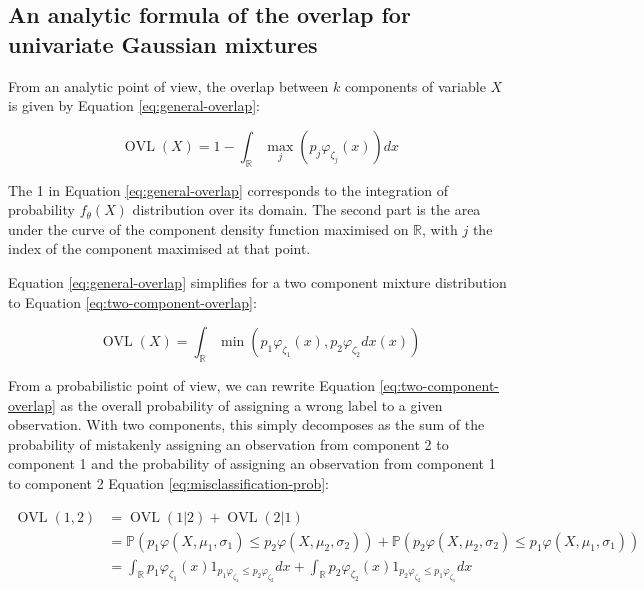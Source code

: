 \hypertarget{an-analytic-formula-of-the-overlap-for-univariate-gaussian-mixtures}{%
\subsection{An analytic formula of the overlap for univariate Gaussian mixtures}\label{an-analytic-formula-of-the-overlap-for-univariate-gaussian-mixtures}}

From an analytic point of view, the overlap between \(k\) components of
variable \(X\) is given by Equation \eqref{eq:general-overlap}:

\begin{equation}
    \operatorname{OVL} (X)= 1 - \int_{\mathbb{R}} \max_j (p_j \varphi_{\zeta_j} (x)) dx
\label{eq:general-overlap}
\end{equation}

The 1 in Equation \eqref{eq:general-overlap} corresponds to the
integration of probability \(f_{\theta}(X)\) distribution over its domain.
The second part is the area under the curve of the component density
function maximised on \(\mathbb{R}\), with \(j\) the index of the component
maximised at that point.

Equation \eqref{eq:general-overlap} simplifies for a two component
mixture distribution to Equation \eqref{eq:two-component-overlap}:

\begin{equation}
    \operatorname{OVL} (X)= \int_{\mathbb{R}} \min \left(p_1 \varphi_{\zeta_1} (x), p_2 \varphi_{\zeta_2} dx (x)\right)
\label{eq:two-component-overlap}
\end{equation}

From a probabilistic point of view, we can rewrite Equation
\eqref{eq:two-component-overlap} as the overall probability of assigning
a wrong label to a given observation. With two components, this simply
decomposes as the sum of the probability of mistakenly assigning an
observation from component 2 to component 1 and the probability of
assigning an observation from component 1 to component 2 Equation
\eqref{eq:misclassification-prob}:

\begin{equation}
\begin{split}
\operatorname{OVL} (1, 2) & = \operatorname{OVL} (1 | 2) + \operatorname{OVL} (2 | 1) \\
& = \mathbb{P}\left(p_1 \varphi (X, \mu_1, \sigma_1) \le p_2 \varphi (X, \mu_2, \sigma_2) \right) + \mathbb{P}\left(p_2 \varphi (X, \mu_2, \sigma_2) \le p_1 \varphi (X, \mu_1, \sigma_1)\right) \\
& = \int_{\mathbb{R}} p_1 \varphi_{\zeta_1} (x) \mathrm{1}_{p_1 \varphi_{\zeta_1}  \le p_2 \varphi_{\zeta_2}} dx + \int_{\mathbb{R}} p_2 \varphi_{\zeta_2} (x) \mathrm{1}_{p_2 \varphi_{\zeta_2} \le p_1 \varphi_{\zeta_1}} dx
\end{split}
\label{eq:misclassification-prob}
\end{equation}

